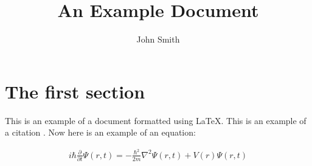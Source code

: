 \documentclass[12pt]{article}
\title{An Example Document}
\author{John Smith}
\date{}
\begin{document}
\maketitle

\section{The first section}

This is an example of a document formatted using \LaTeX{}.
This is an example of a citation \cite{gG07}.
Now here is an example of an equation:

\begin{align}
i\hbar\frac{\partial}{\partial t}\Psi(r,t) = -\frac{\hbar^2}{2m}\nabla^2\Psi(r,t)+V(r)\Psi(r,t)
\end{align}




\end{document}

